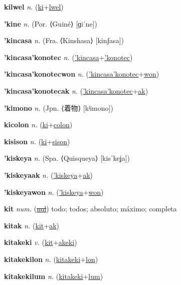\textbf{\hypertarget{kilwel}{kilwel}} \textit{n.} (\hyperlink{ki}{ki}+\allowbreak \hyperlink{lwel}{lwel})


\textbf{\hypertarget{'kine}{'kine}} \textit{n.} (Por. ⟨Guiné⟩ [ɡiˈne])


\textbf{\hypertarget{'kincasa}{'kincasa}} \textit{n.} (Fra. ⟨Kinshasa⟩ [kinʃasa])


\textbf{\hypertarget{'kincasa'konotec}{'kincasa'konotec}} \textit{n.} (\hyperlink{'kincasa}{'kincasa}+\allowbreak \hyperlink{'konotec}{'konotec})


\textbf{\hypertarget{'kincasa'konotecwon}{'kincasa'konotecwon}} \textit{n.} (\hyperlink{'kincasa'konotec}{'kincasa'konotec}+\allowbreak \hyperlink{won}{won})


\textbf{\hypertarget{'kincasa'konotecak}{'kincasa'konotecak}} \textit{n.} (\hyperlink{'kincasa'konotec}{'kincasa'konotec}+\allowbreak \hyperlink{ak}{ak})


\textbf{\hypertarget{'kimono}{'kimono}} \textit{n.} (Jpn. ⟨{\japanese{}着物}⟩ [kʲimono])


\textbf{\hypertarget{kicolon}{kicolon}} \textit{n.} (\hyperlink{ki}{ki}+\allowbreak \hyperlink{colon}{colon})


\textbf{\hypertarget{kisison}{kisison}} \textit{n.} (\hyperlink{ki}{ki}+\allowbreak \hyperlink{sison}{sison})


\textbf{\hypertarget{'kiskeya}{'kiskeya}} \textit{n.} (Spa. ⟨Quisqueya⟩ [kisˈkeʝa])


\textbf{\hypertarget{'kiskeyaak}{'kiskeyaak}} \textit{n.} (\hyperlink{'kiskeya}{'kiskeya}+\allowbreak \hyperlink{ak}{ak})


\textbf{\hypertarget{'kiskeyawon}{'kiskeyawon}} \textit{n.} (\hyperlink{'kiskeya}{'kiskeya}+\allowbreak \hyperlink{won}{won})


\textbf{\hypertarget{kit}{kit}} \textit{num.} (\hyperlink{nul}{\sout{nul}})
todo; todos; absoluto; máximo; completa

\textbf{\hypertarget{kitak}{kitak}} \textit{n.} (\hyperlink{kit}{kit}+\allowbreak \hyperlink{ak}{ak})


\textbf{\hypertarget{kitakeki}{kitakeki}} \textit{v.} (\hyperlink{kit}{kit}+\allowbreak \hyperlink{akeki}{akeki})


\textbf{\hypertarget{kitakekilon}{kitakekilon}} \textit{n.} (\hyperlink{kitakeki}{kitakeki}+\allowbreak \hyperlink{lon}{lon})


\textbf{\hypertarget{kitakekilum}{kitakekilum}} \textit{n.} (\hyperlink{kitakeki}{kitakeki}+\allowbreak \hyperlink{lum}{lum})


